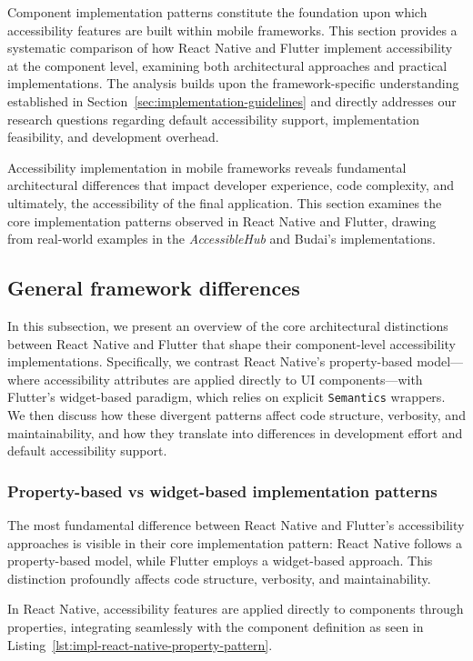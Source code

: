 Component implementation patterns constitute the foundation upon which accessibility features are built within mobile frameworks. This section provides a systematic comparison of how React Native and Flutter implement accessibility at the component level, examining both architectural approaches and practical implementations. The analysis builds upon the framework-specific understanding established in Section~\ref{sec:implementation-guidelines} and directly addresses our
research questions regarding default accessibility support, implementation feasibility, and development overhead.

Accessibility implementation in mobile frameworks reveals fundamental architectural differences that impact developer experience, code complexity, and ultimately, the accessibility of the final application. This section examines the core implementation patterns observed in React Native and Flutter, drawing from real-world examples in the \textit{AccessibleHub} and Budai's implementations. 

\subsection{General framework differences}

In this subsection, we present an overview of the core architectural distinctions between React Native and Flutter that shape their component-level accessibility implementations. Specifically, we contrast React Native’s property-based model—where accessibility attributes are applied directly to UI components—with Flutter’s widget-based paradigm, which relies on explicit \texttt{Semantics} wrappers. We then discuss how these divergent patterns affect code structure, verbosity, and maintainability, and how they translate into differences in development effort and default accessibility support.  

\subsubsection{Property-based vs widget-based implementation patterns}

The most fundamental difference between React Native and Flutter's accessibility approaches is visible in their core implementation pattern: React Native follows a property-based model, while Flutter employs a widget-based approach. This distinction profoundly affects code structure, verbosity, and maintainability.

In React Native, accessibility features are applied directly to components through properties, integrating seamlessly with the component definition as seen in Listing~\ref{lst:impl-react-native-property-pattern}.

